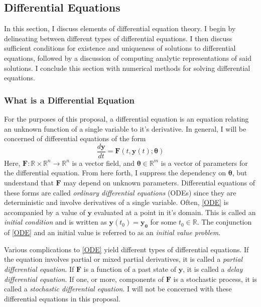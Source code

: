 \subsection{Differential Equations}

In this section, I discuss elements of differential equation theory.  I begin by delineating between different types of differential equations.  I then discuss sufficient conditions for existence and uniqueness of solutions to differential equations, followed by a discussion of computing analytic representations of said solutions.  I conclude this section with numerical methods for solving differential equations.

\subsubsection{What is a Differential Equation}

For the purposes of this proposal, a differential equation is an equation relating an unknown function of a single variable to it's derivative. In general, I will be concerned of differential equations of the form
%
\begin{equation}\label{ODE}
\dfrac{d \mathbf{y}}{dt}  = \mathbf{F}(t,\mathbf{y}(t);\bm{\theta})
\end{equation}
%
Here, $ \mathbf{F} : \mathbb{R} \times \mathbb{R}^n \rightarrow \mathbb{R}^n $ is a vector field, and $ \bm{\theta} \in \mathbb{R}^m $ is a vector of parameters for the differential equation.  From here forth, I suppress the dependency on $ \bm{\theta} $, but understand that $ \mathbf{F} $ may depend on unknown parameters. Differential equations of these forms are called \textit{ordinary differential equations} (ODEs) since they are deterministic and involve derivatives of a single variable.  Often, \cref{ODE} is accompanied by a value of $ \mathbf{y} $  evaluated at a point in it's domain.  This is called an \textit{initial condition} and is written as $ \mathbf{y}(t_0) = \mathbf{y_0} $ for some $ t_0 \in \mathbb{R}$.  The conjunction of \cref{ODE} and an initial value is referred to as an \textit{initial value problem}.

Various complications to \cref{ODE} yield different types of differential equations. If the equation involves partial or mixed partial derivatives, it is called a \textit{partial differential equation}.  If $ \mathbf{F} $ is a function of a past state of $ \mathbf{y} $, it is called a \textit{delay differential equation}.  If one, or more, components of $ \mathbf{F} $ is a stochastic process, it is called a \textit{stochastic differential equation}.  I will not be concerned with these differential equations in this proposal.

